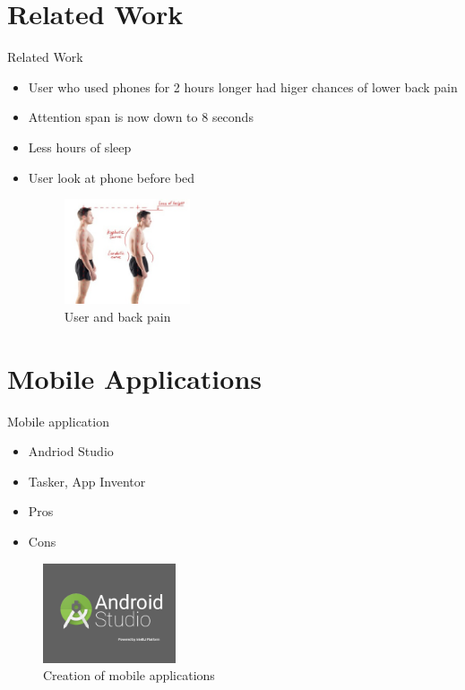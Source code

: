 \documentclass[handout,t]{beamer}
\begin{document}
\section{Related Work}
\begin{frame}{Related Work}
\begin{itemize}
\item User who used phones for 2 hours longer had higer chances of lower back pain
\item Attention span is now down to 8 seconds 
\item Less hours of sleep
\item User look at phone before bed 

\begin{figure}
    \centering
    \includegraphics[width = 0.35\textwidth]{back}
    \caption{User and back pain}
  \end{figure}

\end{itemize}
\end{frame}

\section{Mobile Applications}
\begin{frame}{Mobile application}
\begin{itemize}
\item Andriod Studio
\item Tasker, App Inventor
\item Pros   
\item Cons
\end{itemize}

\begin{figure}
    \centering
    \includegraphics[width = 0.35\textwidth]{studio}
    \caption{Creation of mobile applications }
  \end{figure}

\end{frame}
\end{document}
